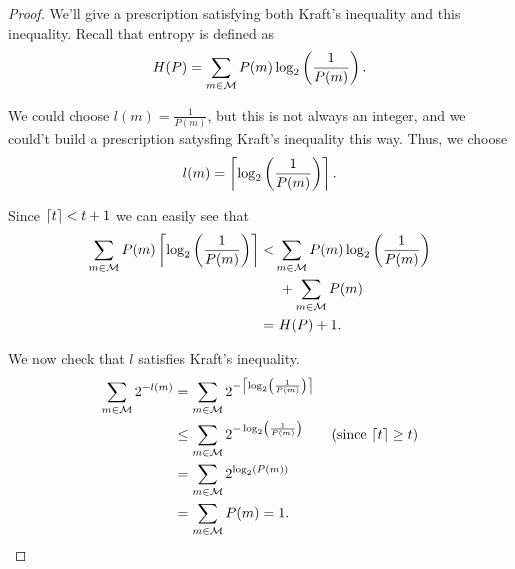 \begin{proof}
	We'll give a prescription satisfying both Kraft's inequality and this inequality. 
	Recall that entropy is defined as
	\begin{equation*}
		H(P) = \sum_{m \in \mathcal{M}} P(m) \log_2 \left( \frac{1}{P(m)} \right). 
	\end{equation*}

	We could choose $l(m) = \frac{1}{P(m)}$, but this is not always an integer, and we could't build a prescription satysfing Kraft's inequality this way.
	Thus, we choose
	\begin{equation*}
		l(m) = \left\lceil{\log_2 \left( \frac{1}{P(m)} \right)}\right\rceil.
	\end{equation*}

	Since $\left\lceil{t}\right\rceil < t + 1$ we can easily see that 
	\begin{align*}
		\sum_{m \in \mathcal{M}} P(m) \left\lceil{\log_2 \left( \frac{1}{P(m)} \right) }\right\rceil
		< &
		\sum_{m \in \mathcal{M}} P(m) \log_2 \left( \frac{1}{P(m)} \right)
		\\
		&~+
		\sum_{m \in \mathcal{M}} P(m)
		\\
		= &~H(P) + 1. 
	\end{align*}

	We now check that $l$ satisfies Kraft's inequality.
	\begin{align*}
		\sum_{m \in \M} 2^{-l(m)}
		& =
		\sum_{m \in \M} 2^{-\ceil{\log_2 \left( \frac{1}{P(m)} \right)}}
		\\ 
		& \le
		\sum_{m \in \M} 2^{-\log_2 \left( \frac{1}{P(m)} \right)}
		\tag{since $\ceil{t} \ge t$}
		\\ 
		& =
		\sum_{m \in \M} 2^{\log_2 (P(m))}
		\\
		& =
		\sum_{m \in \M} P(m) = 1.
	\end{align*}
\end{proof}
